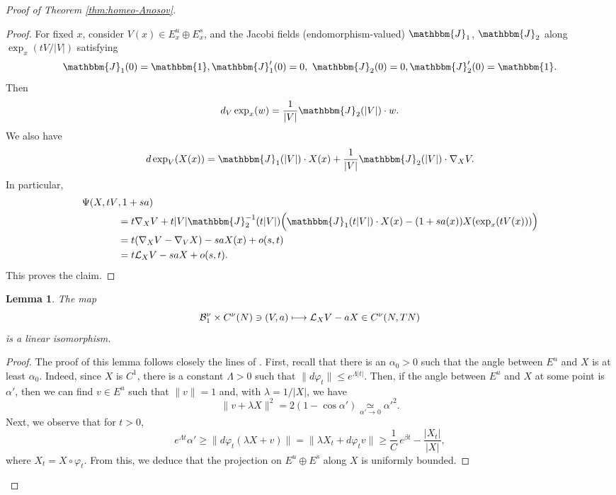 \documentclass[JEP,XML,SOM,Unicode,NoFloatCountersInSection]{cedram}
\newcommand\mto{\mathchoice{\longmapsto}{\mapsto}{\mapsto}{\mapsto}}
\theoremstyle{plain}
\newtheorem{lemma}{Lemma}[section]
\theoremstyle{definition}
\begin{document}
\begin{proof}[Proof of Theorem \ref{thm:homeo-Anosov}]
\begin{proof}
For fixed $x$, consider $V(x) \in E^u_x\oplus E^s_x$, and the Jacobi fields (\ie endomorphism-valued) $\mathbbm{J}_1$, $\mathbbm{J}_2$ along $\exp_x(tV/|V|)$ satisfying
\[
\mathbbm{J}_1(0)= \mathbbm{1},\mathbbm{J}_1'(0)=0,\ \mathbbm{J}_2(0)=0,\mathbbm{J}_2'(0)=\mathbbm{1}.
\]
Then
\[
d_V \exp_x ( w) = \frac{1}{|V|}\mathbbm{J}_2(|V|)\cdot w .
\]
We also have
\[
d \exp_V(X(x)) = \mathbbm{J}_1(|V|)\cdot X(x) + \frac{1}{|V|}\mathbbm{J}_2(|V|)\cdot \nabla_X V.
\]
In particular,
\begin{align*}
\Psi(X,t V&, 1+ s a) \\
& = t\nabla_X V + t|V|\mathbbm{J}_2^{-1}(t|V|) \Big(\mathbbm{J}_1(t|V|)\cdot X(x) - (1+s a(x)) X(\exp_x( t V(x)))\Big)\\
&= t(\nabla_X V - \nabla_V X) - s a X(x) + o(s,t) \\
&= t\mathcal{L}_X V - s a X + o(s,t).
\end{align*}
This proves the claim.\end{proof}

\begin{lemma}
The map
\[
\mathcal{B}_1^\nu\times C^\nu (N) \ni (V,a) \mto \mathcal{L}_X V - a X \in C^\nu(N,TN)
\]
is a linear isomorphism.
\end{lemma}

\begin{proof}
The proof of this lemma follows closely the lines of \cite[Lem.\,A.7, p.\,597]{DeLaLlave-Marco-Moryon-86}. First, recall that there is an $\alpha_0>0$ such that the angle between $E^u$ and $X$ is at least $\alpha_0$. Indeed, since $X$ is $C^1$, there is a constant $\Lambda>0$ such that $\| d\varphi_t\| \leq e^{\Lambda |t|}$. Then, if the angle between $E^u$ and $X $ at some point is $\alpha'$, then we can find $v \in E^u$ such that $\|v\| = 1$ and, with $\lambda = 1/|X|$, we have
\[
\| v + \lambda X \|^2 = 2(1-\cos\alpha') \underset{\alpha'\to 0}\simeq \alpha'^2.
\]
Next, we observe that for $t>0$,
\[
e^{\Lambda t} \alpha' \geq \| d\varphi_t(\lambda X + v)\| = \| \lambda X_t + d\varphi_t v\| \geq \frac{1}{C}\,e^{\beta t} - \frac{|X_t|}{|X|},
\]
where $X_t = X \circ \varphi_t$. From this, we deduce that the projection on $E^u\oplus E^s$ along $X$ is uniformly bounded.


\end{proof}
\end{proof}
\end{document}
